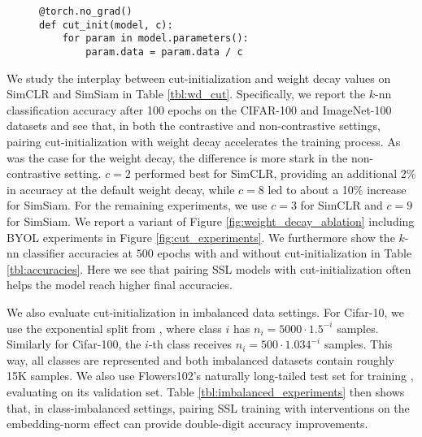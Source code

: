 \begin{figure}
    \begin{lstlisting}[caption={PyTorch code for our cut-initialization layer.}, label={alg:cut_init}, captionpos=b]
@torch.no_grad()
def cut_init(model, c):
    for param in model.parameters():
        param.data = param.data / c
\end{lstlisting}
\end{figure}

We study the interplay between cut-initialization and weight decay values on SimCLR and SimSiam in Table \ref{tbl:wd_cut}. Specifically, we report the $k$-nn classification accuracy after 100 epochs on the CIFAR-100 and ImageNet-100 datasets and see that, in both the contrastive and non-contrastive settings, pairing cut-initialization with weight decay accelerates the training process. As was the case for the weight decay, the difference is more stark in the non-contrastive setting. $c=2$ performed best for SimCLR, providing an additional 2\% in accuracy at the default weight decay, while $c=8$ led to about a 10\% increase for SimSiam. For the remaining experiments, we use $c=3$ for SimCLR and $c=9$ for SimSiam. We report a variant of Figure \ref{fig:weight_decay_ablation} including BYOL experiments in Figure \ref{fig:cut_experiments}. We furthermore show the $k$-nn classifier accuracies at $500$ epochs with and without cut-initialization in Table \ref{tbl:accuracies}. Here we see that pairing SSL models with cut-initialization often helps the model reach higher final accuracies.

We also evaluate cut-initialization in imbalanced data settings. For Cifar-10, we use the exponential split from \cite{dassot}, where class $i$ has $n_i = 5000 \cdot 1.5^{-i}$ samples. Similarly for Cifar-100, the $i$-th class receives $n_i = 500 \cdot 1.034^{-i}$ samples. This way, all classes are represented and both imbalanced datasets contain roughly 15K samples. We also use Flowers102's naturally long-tailed test set for training \citep{flowers}, evaluating on its validation set. Table \ref{tbl:imbalanced_experiments} then shows that, in class-imbalanced settings, pairing SSL training with interventions on the embedding-norm effect can provide double-digit accuracy improvements.

